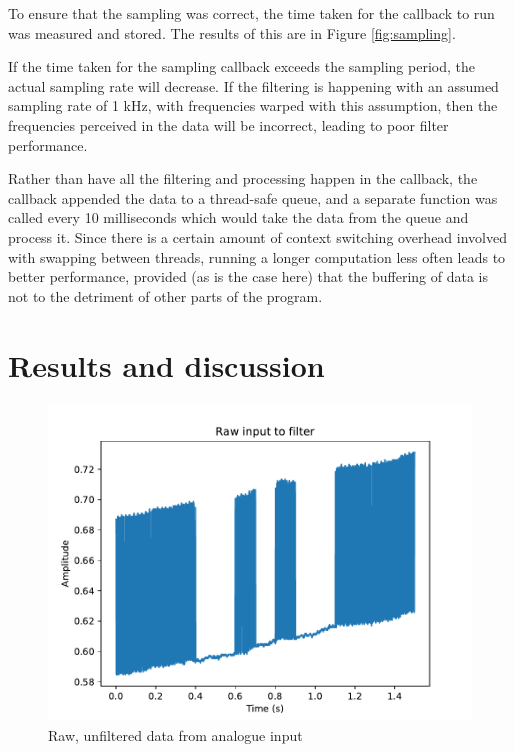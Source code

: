 \documentclass{article}
\begin{document}
\begin{multicols}{2}
To ensure that the sampling was correct, the time taken for the callback to run was measured and stored. The results of this are in Figure \ref{fig:sampling}. 

If the time taken for the sampling callback exceeds the sampling period, the actual sampling rate will decrease. If the filtering is happening with an assumed sampling rate of 1 kHz, with frequencies warped with this assumption, then the frequencies perceived in the data will be incorrect, leading to poor filter performance.

Rather than have all the filtering and processing happen in the callback, the callback appended the data to a thread-safe queue, and a separate function was called every 10 milliseconds which would take the data from the queue and process it. Since there is a certain amount of context switching overhead involved with swapping between threads, running a longer computation less often leads to better performance, provided (as is the case here) that the buffering of data is not to the detriment of other parts of the program. 

\section{Results and discussion}
\begin{figure}[H]
    \includegraphics[width=\linewidth]{figures/raw.pdf}
    \caption{Raw, unfiltered data from analogue input}
    \label{fig:raw}
\end{figure}


\end{multicols}
\end{document}
